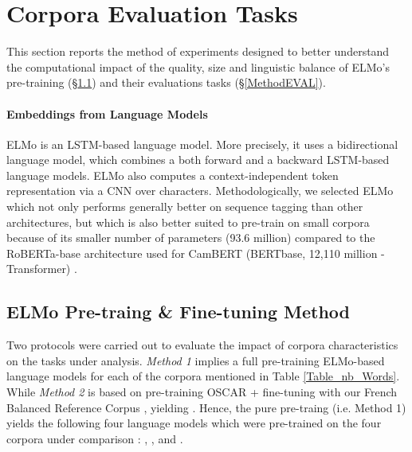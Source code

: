 \section{Corpora Evaluation Tasks} \label{sect:EvalMethod}

This section reports the method of experiments designed to better understand the computational impact of the quality, size and linguistic balance of ELMo's \citep{peters-etal-2018-deep} pre-training (§\ref{MethodTRAIN}) and their evaluations tasks (§\ref{MethodEVAL}).

\paragraph{Embeddings from Language Models} ELMo is an LSTM-based language model. More precisely, it uses a bidirectional language model, which combines a both forward and a backward LSTM-based language models. ELMo also computes a context-independent token representation via a CNN over characters.
Methodologically, we selected ELMo which not only performs generally better on sequence tagging than other architectures, but which is also better suited to pre-train on small corpora because of its smaller number of parameters (93.6 million) compared to the RoBERTa-base architecture used for CamBERT (BERTbase, 12,110 million - Transformer) \citep{martin-etal-2020-camembert}.

\subsection{ELMo Pre-traing \& Fine-tuning Method}\label{MethodTRAIN}

Two protocols were carried out to evaluate the impact of corpora characteristics on the tasks under analysis. \textit{Method 1} implies a full pre-training ELMo-based language models for each of the corpora mentioned in Table \ref{Table_nb_Words}. While \textit{Method 2} is based on pre-training OSCAR + fine-tuning with our French Balanced Reference Corpus \Cabernet, yielding \ELMocoscar.
Hence, the pure pre-traing (i.e. Method 1) yields the following four language models which were pre-trained on the four corpora under comparison :  \ELMooscar, \ELMowiki, \ELMococa and \ELMocbt. %



